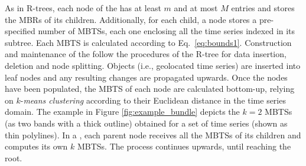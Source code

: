 As in R-trees, each node of the \btsr has at least $m$ and at most $M$ entries and stores the MBRs of its children. Additionally, for each child, a node stores a pre-specified number of MBTSs, each one enclosing all the time series indexed in its subtree. Each MBTS is calculated according to Eq.~\ref{eq:bounds1}. Construction and maintenance of the \btsr follow the procedures of the R-tree for data insertion, deletion and node splitting. Objects (i.e., geolocated time series) are inserted into leaf nodes and any resulting changes are propagated upwards. Once the nodes have been populated, the MBTS of each node are calculated bottom-up, relying on $k$-{\em means clustering} according to their Euclidean distance in the time series domain. The example in Figure \ref{fig:example_bundle} depicts the $k=2$ MBTSs (as two bands with a thick outline) obtained for a set of time series (shown as thin polylines). In a \btsr, each parent node receives all the MBTSs of its children and computes its own $k$ MBTSs. The process continues upwards, until reaching the root. 

